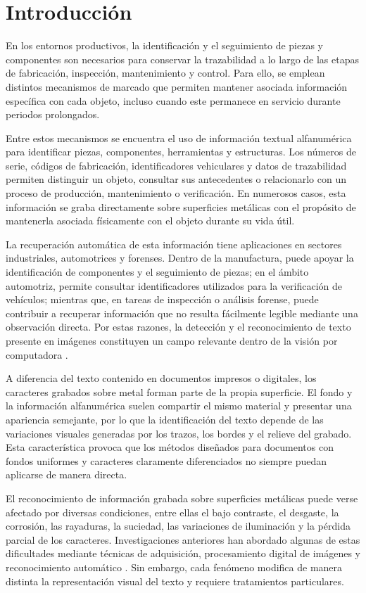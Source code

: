 \chapter{Introducción}

En los entornos productivos, la identificación y el seguimiento de piezas y componentes son necesarios para conservar la trazabilidad a lo largo de las etapas de fabricación, inspección, mantenimiento y control. Para ello, se emplean distintos mecanismos de marcado que permiten mantener asociada información específica con cada objeto, incluso cuando este permanece en servicio durante periodos prolongados.

Entre estos mecanismos se encuentra el uso de información textual alfanumérica para identificar piezas, componentes, herramientas y estructuras. Los números de serie, códigos de fabricación, identificadores vehiculares y datos de trazabilidad permiten distinguir un objeto, consultar sus antecedentes o relacionarlo con un proceso de producción, mantenimiento o verificación. En numerosos casos, esta información se graba directamente sobre superficies metálicas con el propósito de mantenerla asociada físicamente con el objeto durante su vida útil.

La recuperación automática de esta información tiene aplicaciones en sectores industriales, automotrices y forenses. Dentro de la manufactura, puede apoyar la identificación de componentes y el seguimiento de piezas; en el ámbito automotriz, permite consultar identificadores utilizados para la verificación de vehículos; mientras que, en tareas de inspección o análisis forense, puede contribuir a recuperar información que no resulta fácilmente legible mediante una observación directa. Por estas razones, la detección y el reconocimiento de texto presente en imágenes constituyen un campo relevante dentro de la visión por computadora \parencite{Pal2024}.

A diferencia del texto contenido en documentos impresos o digitales, los caracteres grabados sobre metal forman parte de la propia superficie. El fondo y la información alfanumérica suelen compartir el mismo material y presentar una apariencia semejante, por lo que la identificación del texto depende de las variaciones visuales generadas por los trazos, los bordes y el relieve del grabado. Esta característica provoca que los métodos diseñados para documentos con fondos uniformes y caracteres claramente diferenciados no siempre puedan aplicarse de manera directa.

El reconocimiento de información grabada sobre superficies metálicas puede verse afectado por diversas condiciones, entre ellas el bajo contraste, el desgaste, la corrosión, las rayaduras, la suciedad, las variaciones de iluminación y la pérdida parcial de los caracteres. Investigaciones anteriores han abordado algunas de estas dificultades mediante técnicas de adquisición, procesamiento digital de imágenes y reconocimiento automático \parencite{Xiang2018,Yasak2020}. Sin embargo, cada fenómeno modifica de manera distinta la representación visual del texto y requiere tratamientos particulares.

